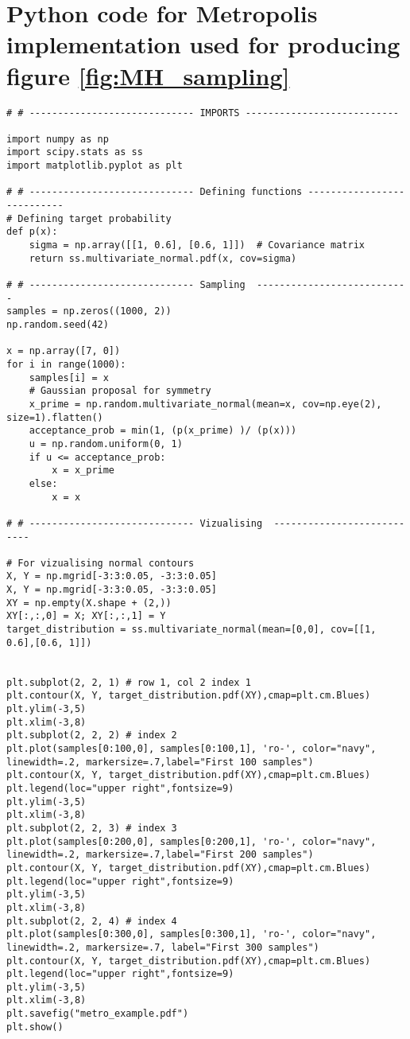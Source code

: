 \begin{appendices}
\begin{lstlisting}
\end{lstlisting}



\section{Python code for Metropolis implementation used for producing figure \ref{fig:MH_sampling} }\label{app:MH_code}
\begin{lstlisting}
# # ----------------------------- IMPORTS ---------------------------

import numpy as np
import scipy.stats as ss
import matplotlib.pyplot as plt

# # ----------------------------- Defining functions ---------------------------
# Defining target probability
def p(x):
    sigma = np.array([[1, 0.6], [0.6, 1]])  # Covariance matrix
    return ss.multivariate_normal.pdf(x, cov=sigma)

# # ----------------------------- Sampling  ---------------------------
samples = np.zeros((1000, 2))
np.random.seed(42)

x = np.array([7, 0])
for i in range(1000):
    samples[i] = x
    # Gaussian proposal for symmetry
    x_prime = np.random.multivariate_normal(mean=x, cov=np.eye(2), size=1).flatten()
    acceptance_prob = min(1, (p(x_prime) )/ (p(x)))
    u = np.random.uniform(0, 1)
    if u <= acceptance_prob:
        x = x_prime
    else:
        x = x

# # ----------------------------- Vizualising  ---------------------------
 
# For vizualising normal contours       
X, Y = np.mgrid[-3:3:0.05, -3:3:0.05]    
X, Y = np.mgrid[-3:3:0.05, -3:3:0.05]
XY = np.empty(X.shape + (2,))
XY[:,:,0] = X; XY[:,:,1] = Y
target_distribution = ss.multivariate_normal(mean=[0,0], cov=[[1, 0.6],[0.6, 1]])


plt.subplot(2, 2, 1) # row 1, col 2 index 1
plt.contour(X, Y, target_distribution.pdf(XY),cmap=plt.cm.Blues)
plt.ylim(-3,5)
plt.xlim(-3,8)
plt.subplot(2, 2, 2) # index 2
plt.plot(samples[0:100,0], samples[0:100,1], 'ro-', color="navy", linewidth=.2, markersize=.7,label="First 100 samples")
plt.contour(X, Y, target_distribution.pdf(XY),cmap=plt.cm.Blues)
plt.legend(loc="upper right",fontsize=9)
plt.ylim(-3,5)
plt.xlim(-3,8)
plt.subplot(2, 2, 3) # index 3
plt.plot(samples[0:200,0], samples[0:200,1], 'ro-', color="navy", linewidth=.2, markersize=.7,label="First 200 samples")
plt.contour(X, Y, target_distribution.pdf(XY),cmap=plt.cm.Blues)
plt.legend(loc="upper right",fontsize=9)
plt.ylim(-3,5)
plt.xlim(-3,8)
plt.subplot(2, 2, 4) # index 4
plt.plot(samples[0:300,0], samples[0:300,1], 'ro-', color="navy", linewidth=.2, markersize=.7, label="First 300 samples")
plt.contour(X, Y, target_distribution.pdf(XY),cmap=plt.cm.Blues)
plt.legend(loc="upper right",fontsize=9)
plt.ylim(-3,5)
plt.xlim(-3,8)
plt.savefig("metro_example.pdf")
plt.show()


\end{lstlisting}
\end{appendices}
